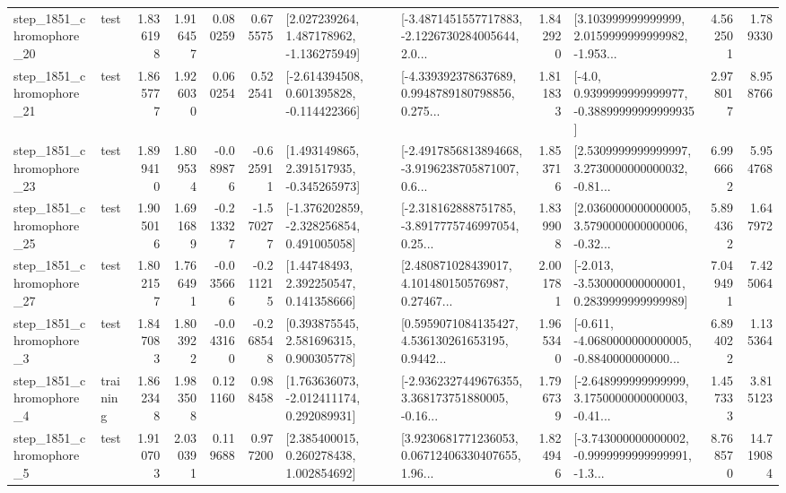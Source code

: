 \begin{tabular}{llrrrrllrlrr}
 step\_1851\_chromophore\_20 &      test &      1.836198 &    1.916457 &      0.080259 &  0.675575 &    [2.027239264, 1.487178962, -1.136275949] &  [-3.4871451557717883, -2.1226730284005644, 2.0... &       1.842920 &  [3.103999999999999, 2.0159999999999982, -1.953... &            4.562501 &          1.789330 \\
 step\_1851\_chromophore\_21 &      test &      1.865777 &    1.926030 &      0.060254 &  0.522541 &   [-2.614394508, 0.601395828, -0.114422366] &  [-4.339392378637689, 0.9948789180798856, 0.275... &       1.811833 &   [-4.0, 0.9399999999999977, -0.38899999999999935] &            2.978017 &          8.958766 \\
 step\_1851\_chromophore\_23 &      test &      1.899410 &    1.809534 &     -0.089876 & -0.625911 &    [1.493149865, 2.391517935, -0.345265973] &  [-2.4917856813894668, -3.9196238705871007, 0.6... &       1.853716 &  [2.5309999999999997, 3.2730000000000032, -0.81... &            6.996662 &          5.954768 \\
 step\_1851\_chromophore\_25 &      test &      1.905016 &    1.691689 &     -0.213327 & -1.570277 &   [-1.376202859, -2.328256854, 0.491005058] &  [-2.318162888751785, -3.8917775746997054, 0.25... &       1.839908 &  [2.0360000000000005, 3.5790000000000006, -0.32... &            5.894362 &          1.647972 \\
 step\_1851\_chromophore\_27 &      test &      1.802157 &    1.766491 &     -0.035666 & -0.211215 &      [1.44748493, 2.392250547, 0.141358666] &  [2.480871028439017, 4.101480150576987, 0.27467... &       2.001781 &   [-2.013, -3.530000000000001, 0.2839999999999989] &            7.049491 &          7.425064 \\
  step\_1851\_chromophore\_3 &      test &      1.847083 &    1.803922 &     -0.043160 & -0.268548 &     [0.393875545, 2.581696315, 0.900305778] &  [0.5959071084135427, 4.536130261653195, 0.9442... &       1.965340 &  [-0.611, -4.0680000000000005, -0.8840000000000... &            6.894022 &          1.135364 \\
  step\_1851\_chromophore\_4 &  training &      1.862348 &    1.983508 &      0.121160 &  0.988458 &    [1.763636073, -2.012411174, 0.292089931] &  [-2.9362327449676355, 3.368173751880005, -0.16... &       1.796739 &  [-2.648999999999999, 3.1750000000000003, -0.41... &            1.457333 &          3.815123 \\
  step\_1851\_chromophore\_5 &      test &      1.910703 &    2.030391 &      0.119688 &  0.977200 &     [2.385400015, 0.260278438, 1.002854692] &  [3.9230681771236053, 0.06712406330407655, 1.96... &       1.824946 &  [-3.743000000000002, -0.9999999999999991, -1.3... &            8.768570 &         14.719084 \\

\end{tabular}
